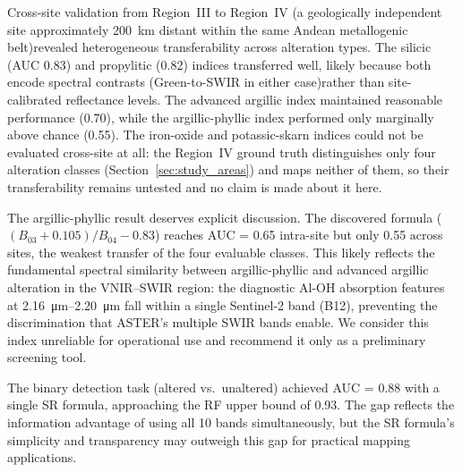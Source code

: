 \documentclass[preprint,authoryear,number]{elsarticle}
\begin{document}
Cross-site validation from Region~III to Region~IV (a geologically independent site approximately \SI{200}{\kilo\meter} distant within the same Andean metallogenic belt)revealed heterogeneous transferability across alteration types. The silicic (AUC 0.83) and propylitic (0.82) indices transferred well, likely because both encode spectral contrasts (Green-to-SWIR in either case)rather than site-calibrated reflectance levels. The advanced argillic index maintained reasonable performance (0.70), while the argillic-phyllic index performed only marginally above chance (0.55). The iron-oxide and potassic-skarn indices could not be evaluated cross-site at all: the Region~IV ground truth distinguishes only four alteration classes (Section~\ref{sec:study_areas}) and maps neither of them, so their transferability remains untested and no claim is made about it here.

The argillic-phyllic result deserves explicit discussion. The discovered formula ($(B_{03} + 0.105)/B_{04} - 0.83$) reaches AUC = 0.65 intra-site but only 0.55 across sites, the weakest transfer of the four evaluable classes. This likely reflects the fundamental spectral similarity between argillic-phyllic and advanced argillic alteration in the VNIR--SWIR region: the diagnostic Al-OH absorption features at \SIrange{2.16}{2.20}{\micro\meter} fall within a single Sentinel-2 band (B12), preventing the discrimination that ASTER's multiple SWIR bands enable. We consider this index unreliable for operational use and recommend it only as a preliminary screening tool.

The binary detection task (altered vs.\ unaltered) achieved AUC = 0.88 with a single SR formula, approaching the RF upper bound of 0.93. The gap reflects the information advantage of using all 10 bands simultaneously, but the SR formula's simplicity and transparency may outweigh this gap for practical mapping applications.
\end{document}
